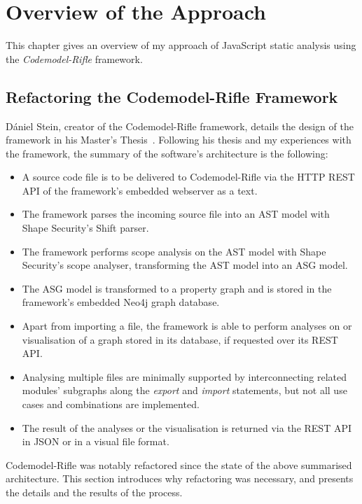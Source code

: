 \chapter{Overview of the Approach}
\label{chapter:overview}

This chapter gives an overview of my approach of JavaScript static analysis using the \emph{Codemodel-Rifle} framework.


\section{Refactoring the Codemodel-Rifle Framework}

Dániel Stein, creator of the Codemodel-Rifle framework, details the design of the framework in his Master's Thesis~\cite{stein-daniel-msc}. Following his thesis and my experiences with the framework, the summary of the software's architecture is the following:

\begin{itemize}
\item A source code file is to be delivered to Codemodel-Rifle via the HTTP REST API of the framework's embedded webserver as a text.
\item The framework parses the incoming source file into an AST model with Shape Security's Shift parser.
\item The framework performs scope analysis on the AST model with Shape Security's scope analyser, transforming the AST model into an ASG model.
\item The ASG model is transformed to a property graph and is stored in the framework's embedded Neo4j graph database.
\item Apart from importing a file, the framework is able to perform analyses on or visualisation of a graph stored in its database, if requested over its REST API.
\item Analysing multiple \es files are minimally supported by interconnecting related modules' subgraphs along the \emph{export} and \emph{import} \es statements, but not all use cases and combinations are implemented.
\item The result of the analyses or the visualisation is returned via the REST API in JSON or in a visual file format.
\end{itemize}

Codemodel-Rifle was notably refactored since the state of the above summarised architecture. This section introduces why refactoring was necessary, and presents the details and the results of the process.


